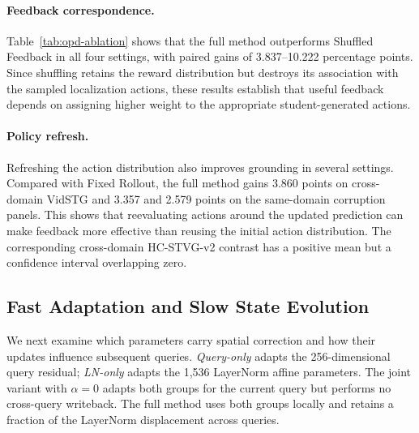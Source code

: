 \documentclass[10pt,twocolumn,letterpaper]{article}
\begin{document}
\paragraph{Feedback correspondence.}
Table~\ref{tab:opd-ablation} shows that the full method
outperforms Shuffled Feedback in all four settings, with
paired gains of 3.837--10.222 percentage points. Since
shuffling retains the reward distribution but destroys its
association with the sampled localization actions, these
results establish that useful feedback depends on assigning
higher weight to the appropriate student-generated actions.

\paragraph{Policy refresh.}
Refreshing the action distribution also improves grounding
in several settings. Compared with Fixed Rollout, the full
method gains 3.860 points on cross-domain VidSTG and
3.357 and 2.579 points on the same-domain corruption
panels. This shows that reevaluating actions around the
updated prediction can make feedback more effective than
reusing the initial action distribution. The corresponding
cross-domain HC-STVG-v2 contrast has a positive mean but
a confidence interval overlapping zero.

\subsection{Fast Adaptation and Slow State Evolution}
\label{sec:state-ablation}

We next examine which parameters carry spatial correction
and how their updates influence subsequent queries.
\emph{Query-only} adapts the 256-dimensional query residual;
\emph{LN-only} adapts the 1,536 LayerNorm affine parameters.
The joint variant with $\alpha=0$ adapts both groups for
the current query but performs no cross-query writeback.
The full method uses both groups locally and retains a
fraction of the LayerNorm displacement across queries.
\end{document}
